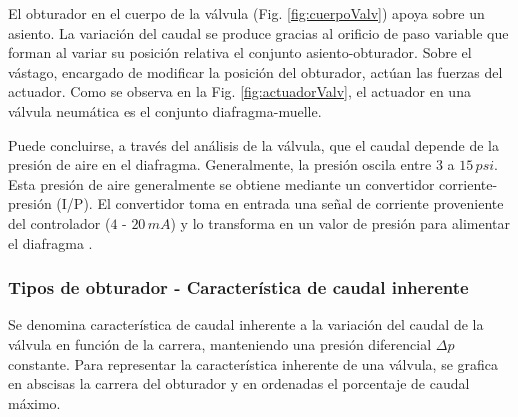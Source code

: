 El obturador en el cuerpo de la válvula (Fig. \ref{fig:cuerpoValv}) apoya
sobre un asiento.
La variación del caudal se produce gracias al orificio de paso variable
que forman al variar su posición relativa el conjunto asiento-obturador.
Sobre el vástago, encargado de modificar la posición del obturador,
actúan las fuerzas del actuador.
Como se observa en la Fig. \ref{fig:actuadorValv}, el actuador en una válvula
neumática es el conjunto diafragma-muelle.

Puede concluirse, a través del análisis de la válvula, que el caudal depende de
la presión de aire en el diafragma.
Generalmente, la presión oscila entre $3$ a $15\,psi$.
Esta presión de aire generalmente se obtiene mediante un convertidor
corriente-presión (I/P).
El convertidor toma en entrada una señal de corriente proveniente del
controlador
($4$ - $20\,mA$) y lo transforma en un valor de presión para alimentar el
diafragma \cite{bib:ApuntesPuglesiValvulas}.

\subsubsection{Tipos de obturador - Característica de caudal inherente}
Se denomina característica de caudal inherente a la variación del caudal de
la válvula en función de la carrera, manteniendo una presión diferencial
$\Delta p$ constante.
Para representar la característica inherente de una válvula, se grafica en
abscisas la carrera del obturador y en ordenadas el porcentaje de caudal máximo.


